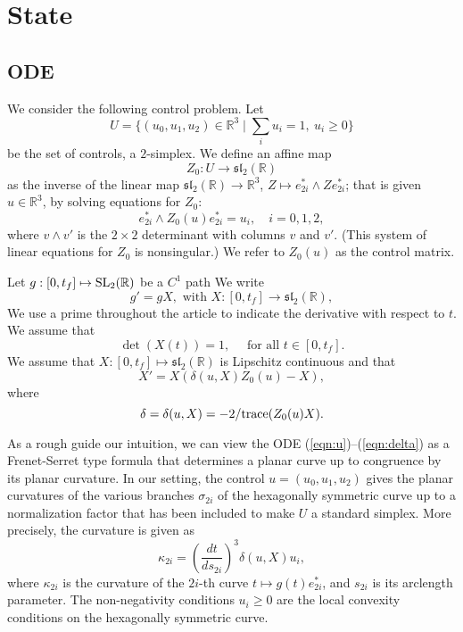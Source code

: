 \documentclass{article}
\theoremstyle{remark}
\newcommand{\ring}[1]{\mathbb{#1}}
\newcommand{\op}[1]{\hbox{#1}}
\def\sl{\mathfrak{sl}_2(\ring{R})}
\def\SL{\op{SL}_2(\ring{R})}
\newcommand\ee[1]{e_{#1}^*}
\begin{document}
\section{State}


\subsection{ODE}


We consider the following control problem.  
Let 
\[
U = \{(u_0,u_1,u_2)\in \ring{R}^3\mid \sum_i u_i = 1,\ u_i\ge 0\}
\]
be the set of controls, a $2$-simplex.
We define an affine map 
\[
Z_0: U\to \sl
\]
as the inverse of the linear map $\sl\to\ring{R}^3$, $Z\mapsto
\ee{2i}\wedge Z \ee{2i}$; that is given $u\in\ring{R}^3$, by solving
equations for $Z_0$:
\begin{equation}\label{eqn:u}
  \ee{2i} \wedge Z_0(u) \ee{2i} = u_i,\quad i = 0,1,2,
\end{equation}
where $v \wedge v'$ is the $2\times 2$ determinant with columns $v$
and $v'$.  (This system of linear equations for $Z_0$ is nonsingular.)
We refer to $Z_0(u)$ as the control matrix.

Let $g:[0,t_f]\mapsto \SL$ be a $C^1$ path 
We write
\begin{equation}\label{eqn:g}
g' = g X, \text{ with } X:[0,t_f]\to \sl,
\end{equation}
We use a prime throughout the article to indicate the derivative
with respect to $t$.
We assume that
\begin{equation}\label{eqn:unit}
\det(X(t))=1,\quad \text{ for all } t\in [0,t_f].
\end{equation}
We assume that $X:[0,t_f]\mapsto \sl$ is Lipschitz continuous and that
\begin{equation}\label{eqn:X'}
X' = X (\delta(u,X) Z_0(u) - X),
\end{equation}
where 
\begin{equation}\label{eqn:delta}
\delta = \delta(u,X) = -2/\op{trace}(Z_0 (u) X).
\end{equation}


As a rough guide our intuition, we can view the ODE
(\ref{eqn:u})--(\ref{eqn:delta}) as a Frenet-Serret type formula that
determines a planar curve up to congruence by its planar curvature.
In our setting, the control $u=(u_0,u_1,u_2)$ gives the planar
curvatures of the various branches $\sigma_{2i}$ of the hexagonally
symmetric curve up to a normalization factor that has been included to
make $U$ a standard simplex.  More precisely, the curvature is given
as
\begin{equation}\label{eqn:kappa}
\kappa_{2i} = \left(\frac{dt}{ds_{2i}}\right)^3 \delta(u,X) u_i,
\end{equation}
where $\kappa_{2i}$ is the curvature of the $2i$-th curve $t\mapsto
g(t) \ee{2i}$, and $s_{2i}$ is its arclength parameter.  The
non-negativity conditions $u_i\ge 0$ are the local convexity
conditions on the hexagonally symmetric curve.
\end{document}
